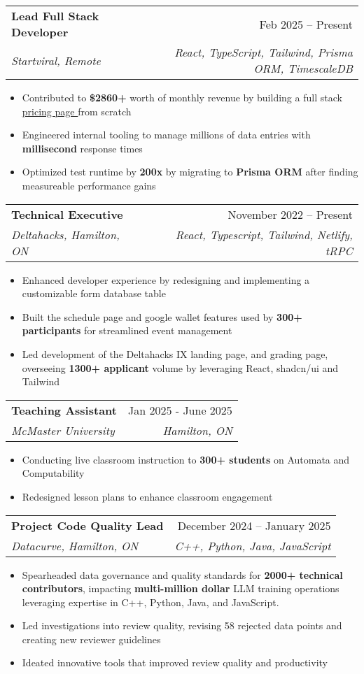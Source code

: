 \documentclass[letterpaper,11pt]{article}
\makeatletter
\newcommand{\resumeItem}[1]{
  \item\small{
    {#1 \vspace{-2pt}}
  }
}
\newcommand{\resumeSubheading}[4]{
  \vspace{-2pt}\item
    \begin{tabular*}{0.97\textwidth}[t]{l@{\extracolsep{\fill}}r}
      \textbf{#1} & #2 \\
      \textit{\small#3} & \textit{\small #4} \\
    \end{tabular*}\vspace{-7pt}
}
\newcommand{\resumeItemListStart}{\begin{itemize}}
\newcommand{\resumeItemListEnd}{\end{itemize}\vspace{-5pt}}
\makeatother
\begin{document}
\resumeSubheading
{Lead Full Stack Developer}{Feb 2025 -- Present}
{Startviral, Remote}{React, TypeScript, Tailwind, Prisma ORM, TimescaleDB}
\resumeItemListStart
\resumeItem{Contributed to \textbf{\$2860+} worth of monthly revenue by building a full stack \href{https://pricing.startviral.de}{\underline{pricing page \faIcon{external-link-alt}}} from scratch}
\resumeItem{Engineered internal tooling to manage millions of data entries with \textbf{millisecond} response times}
\resumeItem{Optimized test runtime by \textbf{200x} by migrating to \textbf{Prisma ORM} after finding measureable performance gains}
\resumeItemListEnd

\resumeSubheading
{Technical Executive}{November 2022 -- Present}
{Deltahacks, Hamilton, ON}{React, Typescript, Tailwind, Netlify, tRPC}
\resumeItemListStart
\resumeItem{Enhanced developer experience by redesigning and implementing a customizable form database table}
\resumeItem{Built the schedule page and google wallet features used by \textbf{300+ participants} for streamlined event management}
\resumeItem{Led development of the Deltahacks IX landing page, and grading page, overseeing \textbf{1300+ applicant} volume by leveraging React, shadcn/ui and Tailwind}
\resumeItemListEnd

\resumeSubheading
{Teaching Assistant}{Jan 2025 - June 2025}
{McMaster University}{Hamilton, ON}
\resumeItemListStart
\resumeItem{Conducting live classroom instruction to \textbf{300+ students} on Automata and Computability}
\resumeItem{Redesigned lesson plans to enhance classroom engagement}
\resumeItemListEnd

\resumeSubheading
{Project Code Quality Lead}{December 2024 -- January 2025}
{Datacurve, Hamilton, ON}{C++, Python, Java, JavaScript}
\resumeItemListStart
\resumeItem{Spearheaded data governance and quality standards for \textbf{2000+ technical contributors}, impacting \textbf{multi-million dollar} LLM training operations leveraging expertise in C++, Python, Java, and JavaScript.}
\resumeItem{Led investigations into review quality, revising 58 rejected data points and creating new reviewer guidelines}
\resumeItem{Ideated innovative tools that improved review quality and productivity}
\resumeItemListEnd

\end{document}
